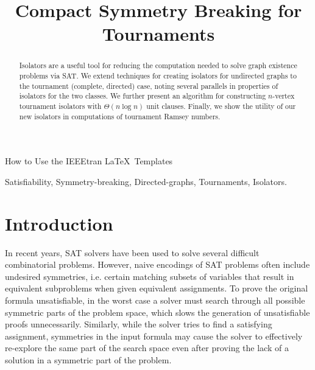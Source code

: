\documentclass[conference]{IEEEtran}
\begin{document}
\title{Compact Symmetry Breaking for Tournaments}

\author{
}

%
{How to Use the IEEEtran \LaTeX \ Templates}

\maketitle

\begin{abstract}
Isolators are a useful tool for reducing the computation needed to solve graph existence problems via SAT.  We extend techniques for creating isolators for undirected graphs to the tournament (complete, directed) case, noting several parallels in properties of isolators for the two classes. We further present an algorithm for constructing $n$-vertex tournament isolators with $\Theta(n \log n)$ unit clauses. Finally, we show the utility of our new isolators in computations of tournament Ramsey numbers.
\end{abstract}

\begin{IEEEkeywords}
Satisfiability, Symmetry-breaking, Directed-graphs, Tournaments, Isolators.
\end{IEEEkeywords}


\section{Introduction}

In recent years, SAT solvers have been used to solve several difficult combinatorial problems. However, naive encodings of SAT problems often include undesired symmetries, i.e. certain matching subsets of variables that result in equivalent subproblems when given equivalent assignments. To prove the original formula unsatisfiable, in the worst case a solver must search through all possible symmetric parts of the problem space, which slows the generation of unsatisfiable proofs unnecessarily. Similarly, while the solver tries to find a satisfying assignment, symmetries in the input formula may cause the solver to effectively re-explore the same part of the search space even after proving the lack of a solution in a symmetric part of the problem.
\end{document}
